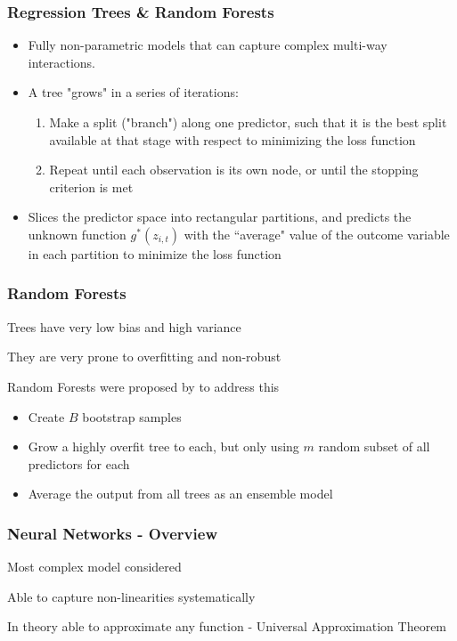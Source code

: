 \documentclass[aspectratio=169]{beamer}
\begin{document}
\begin{frame}
\frametitle{Regression Trees \& Random Forests}
\begin{itemize}
	\item Fully non-parametric models that can capture complex multi-way interactions. 
	\item A tree "grows" in a series of iterations:
	\begin{enumerate}
		\item Make a split ("branch") along one predictor, such that it is the best split available at that stage with respect to minimizing the loss function
		\item Repeat until each observation is its own node, or until the stopping criterion is met
	\end{enumerate}
	\item Slices the predictor space into rectangular partitions, and predicts the unknown function $g^*(z_{i,t})$ with the ``average" value of the outcome variable in each partition to minimize the loss function
\end{itemize}
\end{frame}

\begin{frame}
\frametitle{Random Forests}
Trees have very low bias and high variance

They are very prone to overfitting and non-robust

Random Forests were proposed by \cite{breiman_random_2001} to address this
\begin{itemize}
	\item Create $B$ bootstrap samples
	\item Grow a highly overfit tree to each, but only using $m$ random subset of all predictors for each
	\item Average the output from all trees as an ensemble model
\end{itemize}
\end{frame}


\begin{frame}
\frametitle{Neural Networks - Overview}
Most complex model considered

Able to capture non-linearities systematically

In theory able to approximate any function - Universal Approximation Theorem
\end{frame}
\end{document}
